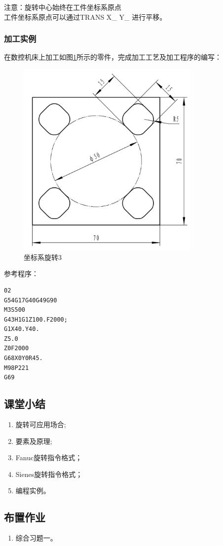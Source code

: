 注意：旋转中心始终在工件坐标系原点\\
工件坐标系原点可以通过TRANS X\_ Y\_ 进行平移。\\

\subsubsection{加工实例}
在数控机床上加工如图\ref{坐标系旋转3}所示的零件，完成加工工艺及加工程序的编写：
\begin{figure}
	\centering	\includegraphics[width=0.8\textwidth]{images/7-2.jpg}
	\caption{坐标系旋转3} \label{坐标系旋转3}
\end{figure}
参考程序：

\begin{lstlisting}
02
G54G17G40G49G90
M3S500
G43H1G1Z100.F2000;
G1X40.Y40.
Z5.0
Z0F2000
G68X0Y0R45.
M98P221
G69
\end{lstlisting}


\subsection{课堂小结}
\begin{enumerate}[1、]
	\item 旋转可应用场合;
	\item 要素及原理;
	\item Fanuc旋转指令格式；
	\item Sienes旋转指令格式；
	\item 编程实例。
\end{enumerate}

\vfill
\subsection{布置作业}
\begin{enumerate}[1、]
	\item 综合习题一。 
\end{enumerate}
\vfill